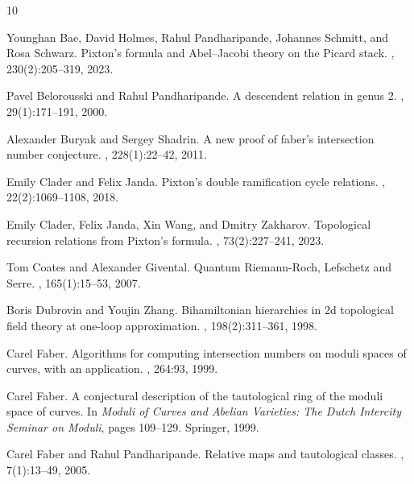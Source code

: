 \documentclass[12pt,reqno]{amsart}
\theoremstyle{plain}
\theoremstyle{definition}
\theoremstyle{remark}
\begin{document}
\begin{thebibliography}{10}

Younghan Bae, David Holmes, Rahul Pandharipande, Johannes Schmitt, and Rosa
  Schwarz.
\newblock Pixton's formula and {A}bel--{J}acobi theory on the {P}icard stack.
, 230(2):205--319, 2023.

Pavel Belorousski and Rahul Pandharipande.
\newblock A descendent relation in genus 2.
, 29(1):171--191, 2000.

Alexander Buryak and Sergey Shadrin.
\newblock A new proof of faber's intersection number conjecture.
, 228(1):22--42, 2011.

Emily Clader and Felix Janda.
\newblock Pixton’s double ramification cycle relations.
, 22(2):1069--1108, 2018.

Emily Clader, Felix Janda, Xin Wang, and Dmitry Zakharov.
\newblock Topological recursion relations from {P}ixton's formula.
, 73(2):227--241, 2023.

Tom Coates and Alexander Givental.
\newblock Quantum {R}iemann-{R}och, {L}efschetz and {S}erre.
, 165(1):15--53, 2007.

Boris Dubrovin and Youjin Zhang.
\newblock Bihamiltonian hierarchies in 2d topological field theory at one-loop
  approximation.
, 198(2):311--361, 1998.

Carel Faber.
\newblock Algorithms for computing intersection numbers on moduli spaces of
  curves, with an application.
, 264:93, 1999.

Carel Faber.
\newblock A conjectural description of the tautological ring of the moduli
  space of curves.
\newblock In {\em Moduli of Curves and Abelian Varieties: The Dutch Intercity
  Seminar on Moduli}, pages 109--129. Springer, 1999.

Carel Faber and Rahul Pandharipande.
\newblock Relative maps and tautological classes.
, 7(1):13--49,
  2005.


\end{thebibliography}
\end{document}
